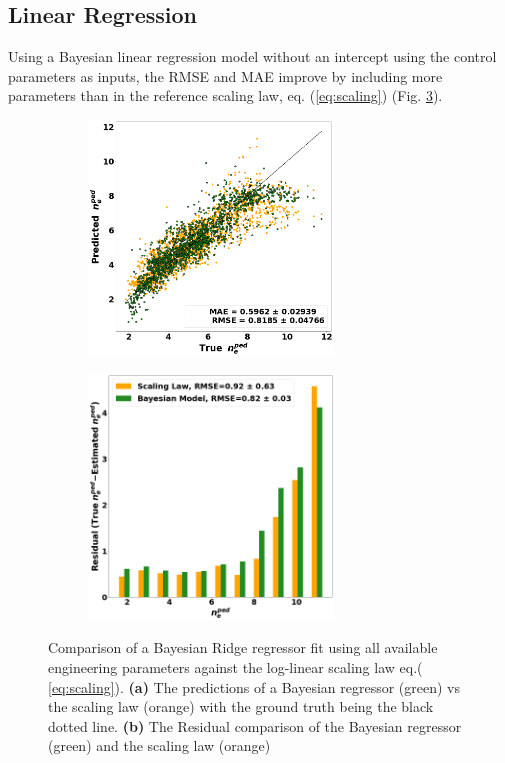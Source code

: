 \documentclass[a4paper, twoside, final, 12pt]{article}
\begin{document}
{\subsection{Linear Regression}

Using a Bayesian linear regression model without an intercept using the control parameters as inputs, the RMSE and MAE improve by including more parameters than in the reference scaling law, eq. (\ref{eq:scaling}) (Fig. \ref{fig:lin_reg}).
\begin{figure}[hb!]
	\centering
	\begin{subfigure}{0.49\linewidth}
		\centering
		\includegraphics[width=6.5cm]{./src/Bay}
		\caption{}
		\label{subfig:bayes_pred}
	\end{subfigure}
	\begin{subfigure}{0.49\linewidth}
		\centering
		\includegraphics[width=6.5cm]{./src/linear_comp_v3}
				\caption{}
		\label{subfig:bayes_resid}
	\end{subfigure}
	\caption{Comparison of a Bayesian Ridge regressor fit using all available engineering parameters against the log-linear scaling law eq.\;( \ref{eq:scaling}). \textbf{(a)} The predictions of a Bayesian regressor (green) vs the scaling law (orange) with the ground truth being the black dotted line. \textbf{(b)} The Residual comparison of the Bayesian regressor (green) and the scaling law (orange) }
	\label{fig:lin_reg}
\end{figure}

}
\end{document}
